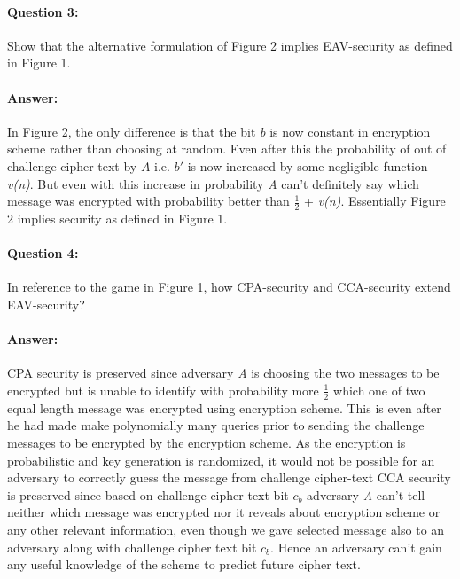 \documentclass{article}
\begin{document}
    \paragraph{Question 3:} Show that the alternative formulation of Figure 2 implies EAV-security as defined in Figure 1.
    \paragraph{Answer: \newline}
        In Figure 2, the only difference is that the bit \emph{b} is now constant in encryption scheme rather than choosing at random. 
        Even after this the probability of out of challenge cipher text by $\mathit{A}$ i.e. $b\prime$ is now increased by some negligible function \emph{v(n)}. But even with this increase in probability \emph{A} can't definitely say which message was encrypted with probability better than $\frac{1}{2}$ + \emph{v(n)}. Essentially Figure 2 implies security as defined in Figure 1.
    
    \paragraph{Question 4:} In reference to the game in Figure 1, how CPA-security and CCA-security extend EAV-security?
    \paragraph{Answer: \newline}
        CPA security is preserved since adversary \emph{A} is choosing the two messages to be encrypted but is unable to identify with probability more $\frac{1}{2}$ which one of two equal length message was encrypted using encryption scheme. This is even after he had made make polynomially many queries prior to sending the challenge messages to be encrypted by the encryption scheme. As the encryption is probabilistic and key generation is randomized, it would not be possible for an adversary to correctly guess the message from challenge cipher-text \newline \newline
        CCA security is preserved since based on challenge cipher-text bit $c_b$ adversary \emph{A} can't tell neither which message was encrypted nor it reveals about encryption scheme or any other relevant information, even though we gave selected message also to an adversary along with challenge cipher text bit $c_b$. Hence an adversary can't gain any useful knowledge of the scheme to predict future cipher text.
\end{document}
